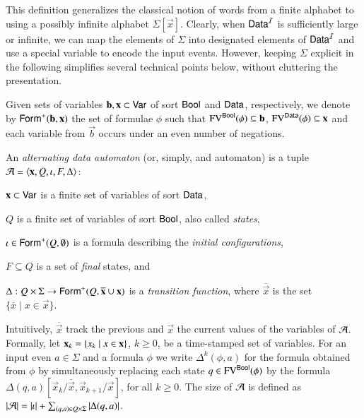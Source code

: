 \documentclass{llncs}
\begin{document}
This definition generalizes the classical notion of words from a
finite alphabet to using a possibly infinite alphabet
$\Sigma[\vec{x}]$. Clearly, when $\mathsf{Data}^{\mathcal{I}}$ is sufficiently large or
infinite, we can map the elements of $\Sigma$ into designated elements
of $\mathsf{Data}^{\mathcal{I}}$ and use a special variable to encode the input
events. However, keeping $\Sigma$ explicit in the following simplifies
several technical points below, without cluttering the presentation.

Given sets of variables $\mathbf b,\mathbf x \subset \mathsf{Var}$ of sort
$\mathsf{Bool}$ and $\mathsf{Data}$, respectively, we denote by
$\mathsf{Form}^+(\mathbf b,\mathbf x)$ the set of formulae $\phi$ such that
$\mathrm{FV}^{\mathsf{Bool}}(\phi) \subseteq \mathbf b$, $\mathrm{FV}^{\mathsf{Data}}(\phi) \subseteq
\mathbf x$ and each variable from $\vec{b}$ occurs under an even number
of negations. 

An \emph{alternating data automaton} (or, simply, and automaton) is a
tuple $\mathcal{A} = \left\langle \mathbf x,Q,\iota,F,\Delta \right\rangle$: \begin{compactitem}
%
\item $\mathbf x \subset \mathsf{Var}$ is a finite set of variables of sort
  $\mathsf{Data}$,
%
\item $Q$ is a finite set of variables of sort $\mathsf{Bool}$, also called
  \emph{states},
%
\item $\iota \in \mathsf{Form}^+(Q,\emptyset)$ is a formula describing the
  \emph{initial configurations},
%
\item $F \subseteq Q$ is a set of \emph{final} states, and
%
\item $\Delta : Q \times \Sigma \rightarrow
  \mathsf{Form}^+(Q,\overline{\mathbf x}\cup\mathbf x)$ is a \emph{transition
    function}, where $\overline{\vec{x}}$ is the set $\{\overline{x}
  \mid x \in \vec{x}\}$.
\end{compactitem}
Intuitively, $\overline{\vec{x}}$ track the previous and $\vec{x}$ the
current values of the variables of $\mathcal{A}$. Formally, let $\mathbf x_k =
\left\{ x_k \mid x \in \mathbf x \right\}$, $k\geq0$, be a time-stamped set of
variables. For an input even $a \in \Sigma$ and a formula $\phi$ we
write $\Delta^k(\phi,a)$ for the formula obtained from $\phi$ by
simultaneously replacing each state $q \in \mathrm{FV}^{\mathsf{Bool}}(\phi)$ by the
formula
$\Delta(q,a)[\vec{x}_k/\overline{\vec{x}},\vec{x}_{k+1}/\vec{x}]$, for
all $k\geq0$. The size of $\mathcal{A}$ is defined as ${|{\mathcal{A}}|} = {|{\iota}|} +
\sum_{(q,a) \in Q\times\Sigma}{|{\Delta(q,a)}|}$.
\end{document}
